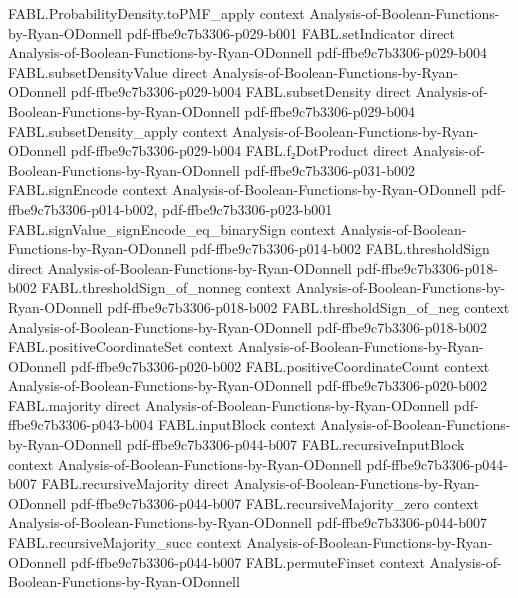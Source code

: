 \begin{theorem}
  {FABL.ProbabilityDensity.toPMF_apply}
  {context}
  {Analysis-of-Boolean-Functions-by-Ryan-ODonnell}
  {pdf-ffbe9c7b3306-p029-b001}
\proofstep
  {FABL.setIndicator}
  {direct}
  {Analysis-of-Boolean-Functions-by-Ryan-ODonnell}
  {pdf-ffbe9c7b3306-p029-b004}
\proofstep
  {FABL.subsetDensityValue}
  {direct}
  {Analysis-of-Boolean-Functions-by-Ryan-ODonnell}
  {pdf-ffbe9c7b3306-p029-b004}
\proofstep
  {FABL.subsetDensity}
  {direct}
  {Analysis-of-Boolean-Functions-by-Ryan-ODonnell}
  {pdf-ffbe9c7b3306-p029-b004}
\proofstep
  {FABL.subsetDensity_apply}
  {context}
  {Analysis-of-Boolean-Functions-by-Ryan-ODonnell}
  {pdf-ffbe9c7b3306-p029-b004}
\proofstep
  {FABL.f₂DotProduct}
  {direct}
  {Analysis-of-Boolean-Functions-by-Ryan-ODonnell}
  {pdf-ffbe9c7b3306-p031-b002}
\proofstep
  {FABL.signEncode}
  {context}
  {Analysis-of-Boolean-Functions-by-Ryan-ODonnell}
  {pdf-ffbe9c7b3306-p014-b002,
    pdf-ffbe9c7b3306-p023-b001}
\proofstep
  {FABL.signValue_signEncode_eq_binarySign}
  {context}
  {Analysis-of-Boolean-Functions-by-Ryan-ODonnell}
  {pdf-ffbe9c7b3306-p014-b002}
\proofstep
  {FABL.thresholdSign}
  {direct}
  {Analysis-of-Boolean-Functions-by-Ryan-ODonnell}
  {pdf-ffbe9c7b3306-p018-b002}
\proofstep
  {FABL.thresholdSign_of_nonneg}
  {context}
  {Analysis-of-Boolean-Functions-by-Ryan-ODonnell}
  {pdf-ffbe9c7b3306-p018-b002}
\proofstep
  {FABL.thresholdSign_of_neg}
  {context}
  {Analysis-of-Boolean-Functions-by-Ryan-ODonnell}
  {pdf-ffbe9c7b3306-p018-b002}
\proofstep
  {FABL.positiveCoordinateSet}
  {context}
  {Analysis-of-Boolean-Functions-by-Ryan-ODonnell}
  {pdf-ffbe9c7b3306-p020-b002}
\proofstep
  {FABL.positiveCoordinateCount}
  {context}
  {Analysis-of-Boolean-Functions-by-Ryan-ODonnell}
  {pdf-ffbe9c7b3306-p020-b002}
\proofstep
  {FABL.majority}
  {direct}
  {Analysis-of-Boolean-Functions-by-Ryan-ODonnell}
  {pdf-ffbe9c7b3306-p043-b004}
\proofstep
  {FABL.inputBlock}
  {context}
  {Analysis-of-Boolean-Functions-by-Ryan-ODonnell}
  {pdf-ffbe9c7b3306-p044-b007}
\proofstep
  {FABL.recursiveInputBlock}
  {context}
  {Analysis-of-Boolean-Functions-by-Ryan-ODonnell}
  {pdf-ffbe9c7b3306-p044-b007}
\proofstep
  {FABL.recursiveMajority}
  {direct}
  {Analysis-of-Boolean-Functions-by-Ryan-ODonnell}
  {pdf-ffbe9c7b3306-p044-b007}
\proofstep
  {FABL.recursiveMajority_zero}
  {context}
  {Analysis-of-Boolean-Functions-by-Ryan-ODonnell}
  {pdf-ffbe9c7b3306-p044-b007}
\proofstep
  {FABL.recursiveMajority_succ}
  {context}
  {Analysis-of-Boolean-Functions-by-Ryan-ODonnell}
  {pdf-ffbe9c7b3306-p044-b007}
\proofstep
  {FABL.permuteFinset}
  {context}
  {Analysis-of-Boolean-Functions-by-Ryan-ODonnell}

\end{theorem}
